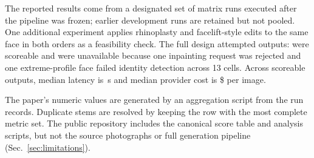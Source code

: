 The reported results come from a designated set of matrix runs executed after the
pipeline was frozen; earlier development runs are retained but not pooled. One
additional experiment applies rhinoplasty and facelift-style edits to the same
face in both orders as a feasibility check. The full design attempted
\NumAttemptedEdits{} outputs: \NumScoredEdits{} were scoreable and
\NumExcludedEdits{} were unavailable because one inpainting request was rejected
and one extreme-profile face failed identity detection across 13 cells. Across
scoreable outputs, median latency is \MedLatency{}\,s and median provider cost is
\$\MedCost{} per image.

The paper's numeric values are generated by an aggregation script from the run
records. Duplicate stems are resolved by keeping the row with the most complete
metric set. The public repository includes the canonical score table and
analysis scripts, but not the source photographs or full generation pipeline
(Sec.~\ref{sec:limitations}).
